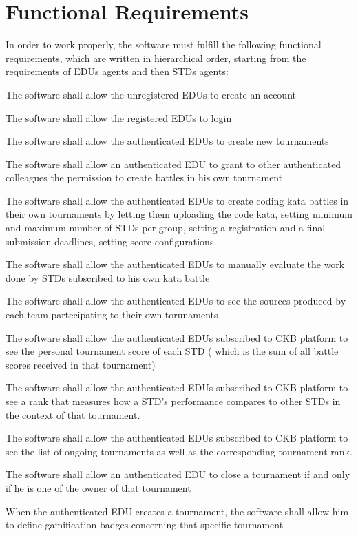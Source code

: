 \section{Functional Requirements}
In order to work properly, the software must fulfill the following functional requirements, which are written in hierarchical order, starting from the requirements of EDUs agents and then STDs agents:
\begin{requirementsenumerate}
    \item The software shall allow the unregistered EDUs to create an account
    \item The software shall allow the registered EDUs to login
    \item The software shall allow the authenticated EDUs to create new tournaments
    \item The software shall allow an authenticated EDU to grant to other authenticated colleagues the permission to create battles in his own tournament
    \item The software shall allow the authenticated EDUs to create coding kata battles in their own tournaments by letting them uploading the code kata, setting minimum and maximum number of STDs per group, setting a registration and a final submission deadlines, setting score configurations
    \item The software shall allow the authenticated EDUs to manually evaluate the work done by STDs subscribed to his own kata battle
    \item The software shall allow the authenticated EDUs to see the sources produced by each team partecipating to their own torunaments
    \item The software shall allow the authenticated EDUs subscribed to CKB platform to see the personal tournament score of each STD ( which is the sum of all battle scores received in that tournament)
    \item The software shall allow the authenticated EDUs subscribed to CKB platform to see a rank that measures how a STD's performance compares to other STDs in the context of that tournament.
    \item The software shall allow the authenticated EDUs subscribed to CKB platform to see the list of ongoing tournaments as well as the corresponding tournament rank.
    \item The software shall allow an authenticated EDU to close a tournament if and only if he is one of the owner of that tournament
    \item When the authenticated EDU creates a tournament, the software shall allow him to define gamification badges concerning that specific tournament

\end{requirementsenumerate}
